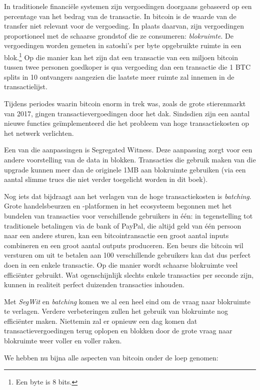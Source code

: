 \documentclass[
  letterpaper,
]{scrbook}
\begin{document}
In traditionele financiële systemen zijn vergoedingen doorgaans
gebaseerd op een percentage van het bedrag van de transactie. In bitcoin
is de waarde van de transfer niet relevant voor de vergoeding. In plaats
daarvan, zijn vergoedingen proportioneel met de schaarse grondstof die
ze consumeren: \emph{blokruimte}. De vergoedingen worden gemeten in
satoshi's per byte opgebruikte ruimte in een blok.\footnote{Een byte is
  8 bits.} Op die manier kan het zijn dat een transactie van een miljoen
bitcoin tussen twee personen goedkoper is qua vergoeding dan een
transactie die 1 BTC splits in 10 ontvangers aangezien die laatste meer
ruimte zal innemen in de transactielijst.

Tijdens periodes waarin bitcoin enorm in trek was, zoals de grote
stierenmarkt van 2017, gingen transactievergoedingen door het dak.
Sindsdien zijn een aantal nieuwe functies geïmplementeerd die het
probleem van hoge transactiekosten op het netwerk verlichten.

Een van die aanpassingen is Segregated Witness. Deze aanpassing zorgt
voor een andere voorstelling van de data in blokken. Transacties die
gebruik maken van die upgrade kunnen meer dan de originele 1MB aan
blokruimte gebruiken (via een aantal slimme trucs die niet verder
toegelicht worden in dit boek).

Nog iets dat bijdraagt aan het verlagen van de hoge transactiekosten is
\emph{batching}. Grote handelsbeurzen en -platformen in het ecosysteem
begonnen met het bundelen van transacties voor verschillende gebruikers
in één: in tegenstelling tot traditionele betalingen via de bank of
PayPal, die altijd geld van één persoon naar een andere sturen, kan een
bitcointransactie een groot aantal inputs combineren en een groot aantal
outputs produceren. Een beurs die bitcoin wil versturen om uit te
betalen aan 100 verschillende gebruikers kan dat dus perfect doen in een
enkele transactie. Op die manier wordt schaarse blokruimte veel
efficiënter gebruikt. Wat ogenschijnlijk slechts enkele transacties per
seconde zijn, kunnen in realiteit perfect duizenden transacties
inhouden.

Met \emph{SegWit} en \emph{batching} komen we al een heel eind om de
vraag naar blokruimte te verlagen. Verdere verbeteringen zullen het
gebruik van blokruimte nog efficiënter maken. Niettemin zal er opnieuw
een dag komen dat transactievergoedingen terug oplopen en blokken door
de grote vraag naar blokruimte weer voller en voller raken.

We hebben nu bijna alle aspecten van bitcoin onder de loep genomen:
\end{document}
